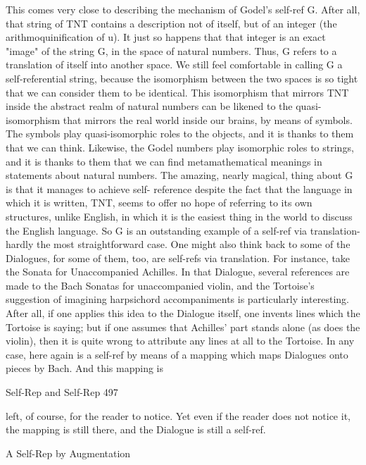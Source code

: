 {This comes very close to describing the mechanism of Godel's self-ref G. After all, that string
of TNT contains a description not of itself, but of an integer (the arithmoquinification of u). It
just so happens that that integer is an exact "image" of the string G, in the space of natural
numbers. Thus, G refers to a translation of itself into another space. We still feel comfortable
in calling G a self-referential string, because the isomorphism between the two spaces is so
tight that we can consider them to be identical.
         This isomorphism that mirrors TNT inside the abstract realm of natural numbers can
be likened to the quasi-isomorphism that mirrors the real world inside our brains, by means
of symbols. The symbols play quasi-isomorphic roles to the objects, and it is thanks to them
that we can think. Likewise, the Godel numbers play isomorphic roles to strings, and it is
thanks to them that we can find metamathematical meanings in statements about natural
numbers. The amazing, nearly magical, thing about G is that it manages to achieve self-
reference despite the fact that the language in which it is written, TNT, seems to offer no
hope of referring to its own structures, unlike English, in which it is the easiest thing in the
world to discuss the English language.
         So G is an outstanding example of a self-ref via translation-hardly the most
straightforward case. One might also think back to some of the Dialogues, for some of them,
too, are self-refs via translation. For instance, take the Sonata for Unaccompanied Achilles.
In that Dialogue, several references are made to the Bach Sonatas for unaccompanied violin,
and the Tortoise's suggestion of imagining harpsichord accompaniments is particularly
interesting. After all, if one applies this idea to the Dialogue itself, one invents lines which
the Tortoise is saying; but if one assumes that Achilles' part stands alone (as does the violin),
then it is quite wrong to attribute any lines at all to the Tortoise. In any case, here again is a
self-ref by means of a mapping which maps Dialogues onto pieces by Bach. And this
mapping is




Self-Rep and Self-Rep                                                                         497

left, of course, for the reader to notice. Yet even if the reader does not notice it, the mapping
is still there, and the Dialogue is still a self-ref.

                                A Self-Rep by Augmentation

}

